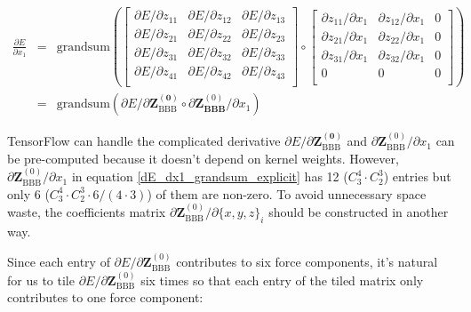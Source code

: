 \documentclass{article}
\begin{document}
\begin{eqnarray}
\frac{\partial{E}}{\partial{x_1}} 
& = & 
\mathrm{grandsum}\left(
	\left[\begin{array}{ccc}
		\partial{E} / \partial{z_{11}} & 
		\partial{E} / \partial{z_{12}} &
		\partial{E} / \partial{z_{13}} \\ 
		\partial{E} / \partial{z_{21}} &
		\partial{E} / \partial{z_{22}} &
		\partial{E} / \partial{z_{23}} \\
		\partial{E} / \partial{z_{31}} &
		\partial{E} / \partial{z_{32}} &
		\partial{E} / \partial{z_{33}} \\
		\partial{E} / \partial{z_{41}} &
		\partial{E} / \partial{z_{42}} &
		\partial{E} / \partial{z_{43}} \\
		\end{array}
	\right] 
	\circ 
	\left[\begin{array}{ccc}
		\partial{z_{11}} / \partial{x_1} & 
		\partial{z_{12}} / \partial{x_1} &
		0 \\ 
		\partial{z_{21}} / \partial{x_1} &
		\partial{z_{22}} / \partial{x_1} &
		0 \\
		\partial{z_{31}} / \partial{x_1} &
		\partial{z_{32}} / \partial{x_1} &
		0 \\
		0 &
		0 &
		0 \\	
		\end{array}
	\right]
\right) \label{dE_dx1_grandsum_explicit} \\
& = &
\mathrm{grandsum}\left(
	\partial{E} / \partial{\mathbf{Z^{(0)}_{\mathrm{BBB}}}} 
	\circ
	\partial{\mathbf{Z}^{(0)}_{\mathbf{BBB}}} / \partial{x_1}
\right)
\end{eqnarray}

\noindent TensorFlow can handle the complicated derivative 
$\partial{E} / \partial{\mathbf{Z^{(0)}_{\mathrm{BBB}}}}$ and 
$\partial{\mathbf{Z}^{(0)}_{\mathrm{BBB}}} / \partial{x_1}$ can be pre-computed because it 
doesn't depend on kernel weights. 
However, $\partial{\mathbf{Z}^{(0)}_{\mathrm{BBB}}} / \partial{x_1}$ in equation 
\ref{dE_dx1_grandsum_explicit} has 12 ($C^4_3 \cdot C^3_2$) entries 
but only 6 ($C^4_3 \cdot C^3_2 \cdot 6 / (4 \cdot 3)$) of them are non-zero. 
To avoid unnecessary space waste, the coefficients matrix 
$\partial{\mathbf{Z}^{(0)}_{\mathrm{BBB}}} / \partial{\{x, y, z\}_i}$ should be constructed in
another way.

Since each entry of $\partial{E} / \partial{\mathbf{Z}^{(0)}_{\mathrm{BBB}}}$ contributes 
to six force components, it's natural for us to tile 
$\partial{E} / \partial{\mathbf{Z}^{(0)}_{\mathrm{BBB}}}$ six times so that each entry of the 
tiled matrix only contributes to one force component:
\end{document}
